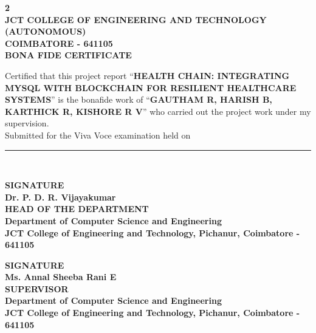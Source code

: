 \documentclass[12pt,a4paper]{report}
\begin{document}
\begin{titlepage}
\thispagestyle{empty}
\begin{center}
\vspace*{\fill}
{\fontsize{14}{21}\selectfont\textbf{2}}\\[0.20cm]
{\fontsize{14}{21}\selectfont\textbf{JCT COLLEGE OF ENGINEERING AND TECHNOLOGY}}\\[0.20cm]
{\fontsize{14}{21}\selectfont\textbf{(AUTONOMOUS)}}\\[0.20cm]
{\fontsize{14}{21}\selectfont\textbf{COIMBATORE - 641105}}\\[0.85cm]
{\fontsize{16}{24}\selectfont\textbf{BONA FIDE CERTIFICATE}}\\[0.65cm]

{\fontsize{14}{21}\selectfont
\begin{minipage}{0.90\textwidth}
\setlength{\parindent}{0pt}
Certified that this project report ``\textbf{HEALTH CHAIN: INTEGRATING MYSQL WITH BLOCKCHAIN FOR RESILIENT HEALTHCARE SYSTEMS}''
is the bonafide work of ``\textbf{GAUTHAM R, HARISH B, KARTHICK R, KISHORE R V}''
who carried out the project work under my supervision.
\\[0.45cm]
Submitted for the Viva Voce examination held on \rule{4cm}{0.4pt}
\end{minipage}}\\[1.4cm]
\end{center}

\begin{center}
\begin{minipage}{0.96\textwidth}
\begin{minipage}[t]{0.47\textwidth}
\textbf{SIGNATURE}\\[0.65cm]
\textbf{Dr. P. D. R. Vijayakumar}\\
\textbf{HEAD OF THE DEPARTMENT}\\[0.40cm]
\textbf{Department of Computer Science and Engineering}\\[0.35cm]
\textbf{JCT College of Engineering and Technology, Pichanur, Coimbatore - 641105}
\end{minipage}
\hfill
\begin{minipage}[t]{0.47\textwidth}
\textbf{SIGNATURE}\\[0.65cm]
\textbf{Ms. Annal Sheeba Rani E}\\
\textbf{SUPERVISOR}\\[0.35cm]
\textbf{Department of Computer Science and Engineering}\\[0.35cm]
\textbf{JCT College of Engineering and Technology, Pichanur, Coimbatore - 641105}
\end{minipage}
\end{minipage}
\end{center}


\end{titlepage}
\end{document}
